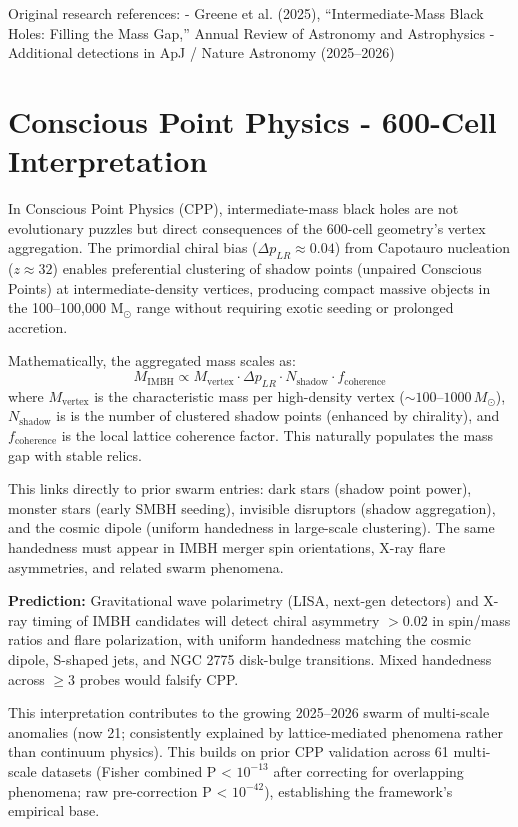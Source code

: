 \documentclass[11pt]{article}
\begin{document}
Original research references:  
- Greene et al. (2025), ``Intermediate-Mass Black Holes: Filling the Mass Gap,'' Annual Review of Astronomy and Astrophysics  
- Additional detections in ApJ / Nature Astronomy (2025--2026)

\section{Conscious Point Physics - 600-Cell Interpretation}
In Conscious Point Physics (CPP), intermediate-mass black holes are not evolutionary puzzles but direct consequences of the 600-cell geometry's vertex aggregation. The primordial chiral bias ($\Delta p_{LR} \approx 0.04$) from Capotauro nucleation ($z \approx 32$) enables preferential clustering of shadow points (unpaired Conscious Points) at intermediate-density vertices, producing compact massive objects in the 100–100,000 M$_\odot$ range without requiring exotic seeding or prolonged accretion.

Mathematically, the aggregated mass scales as:
\[
M_{\text{IMBH}} \propto M_{\text{vertex}} \cdot \Delta p_{LR} \cdot N_{\text{shadow}} \cdot f_{\text{coherence}}
\]
where $M_{\text{vertex}}$ is the characteristic mass per high-density vertex ($\sim 100$--$1000\, M_\odot$), $N_{\text{shadow}}$ is is the number of clustered shadow points (enhanced by chirality), and $f_{\text{coherence}}$ is the local lattice coherence factor. This naturally populates the mass gap with stable relics.

This links directly to prior swarm entries: dark stars (shadow point power), monster stars (early SMBH seeding), invisible disruptors (shadow aggregation), and the cosmic dipole (uniform handedness in large-scale clustering). The same handedness must appear in IMBH merger spin orientations, X-ray flare asymmetries, and related swarm phenomena.

\textbf{Prediction:} Gravitational wave polarimetry (LISA, next-gen detectors) and X-ray timing of IMBH candidates will detect chiral asymmetry $>0.02$ in spin/mass ratios and flare polarization, with uniform handedness matching the cosmic dipole, S-shaped jets, and NGC 2775 disk-bulge transitions. Mixed handedness across $\geq 3$ probes would falsify CPP.

This interpretation contributes to the growing 2025--2026 swarm of multi-scale anomalies (now 21; consistently explained by lattice-mediated phenomena rather than continuum physics). This builds on prior CPP validation across 61 multi-scale datasets (Fisher combined P < $10^{-13}$ after correcting for overlapping phenomena; raw pre-correction P < $10^{-42}$), establishing the framework's empirical base.
\end{document}

